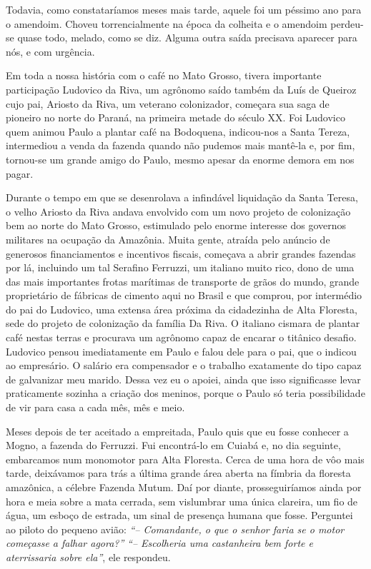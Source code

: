 Todavia, como constataríamos meses mais tarde, aquele foi um péssimo ano para o amendoim.
Choveu torrencialmente na época da colheita e o amendoim perdeu-se quase todo, melado, como se diz.
Alguma outra saída precisava aparecer para nós, e com urgência.

Em toda a nossa história com o café no Mato Grosso, tivera importante participação Ludovico da Riva, um agrônomo saído também da Luís de Queiroz cujo pai, Ariosto da Riva, um veterano colonizador, começara sua saga de pioneiro no norte do Paraná, na primeira metade do século XX.
Foi Ludovico quem animou Paulo a plantar café na Bodoquena, indicou-nos a Santa Tereza, intermediou a venda da fazenda quando não pudemos mais mantê-la e, por fim, tornou-se um grande amigo do Paulo, mesmo apesar da enorme demora em nos pagar.

Durante o tempo em que se desenrolava a infindável liquidação da Santa Teresa, o velho Ariosto da Riva andava envolvido com um novo projeto de colonização bem ao norte do Mato Grosso, estimulado pelo enorme interesse dos governos militares na ocupação da Amazônia.
Muita gente, atraída pelo anúncio de generosos financiamentos e incentivos fiscais, começava a abrir grandes fazendas por lá, incluindo um tal Serafino Ferruzzi, um italiano muito rico, dono de uma das mais importantes frotas marítimas de transporte de grãos do mundo, grande proprietário de fábricas de cimento aqui no Brasil e que comprou, por intermédio do pai do Ludovico, uma extensa área próxima da cidadezinha de Alta Floresta, sede do projeto de colonização da família Da Riva.
O italiano cismara de plantar café nestas terras e procurava um agrônomo capaz de encarar o titânico desafio.
Ludovico pensou imediatamente em Paulo e falou dele para o pai, que o indicou ao empresário.
O salário era compensador e o trabalho exatamente do tipo capaz de galvanizar meu marido.
Dessa vez eu o apoiei, ainda que isso significasse levar praticamente sozinha a criação dos meninos, porque o Paulo só teria possibilidade de vir para casa a cada mês, mês e meio.

Meses depois de ter aceitado a empreitada, Paulo quis que eu fosse conhecer a Mogno, a fazenda do Ferruzzi.
Fui encontrá-lo em Cuiabá e, no dia seguinte, embarcamos num monomotor para Alta Floresta.
Cerca de uma hora de vôo mais tarde, deixávamos para trás a última grande área aberta na fímbria da floresta amazônica, a célebre Fazenda Mutum.
Daí por diante, prosseguiríamos ainda por hora e meia sobre a mata cerrada, sem vislumbrar uma única clareira, um fio de água, um esboço de estrada, um sinal de presença humana que fosse.
Perguntei ao piloto do pequeno avião:
\textit{``-- Comandante, o que o senhor faria se o motor começasse a falhar agora?''} 
\textit{``-- Escolheria uma castanheira bem forte e aterrissaria sobre ela''}, ele respondeu.

